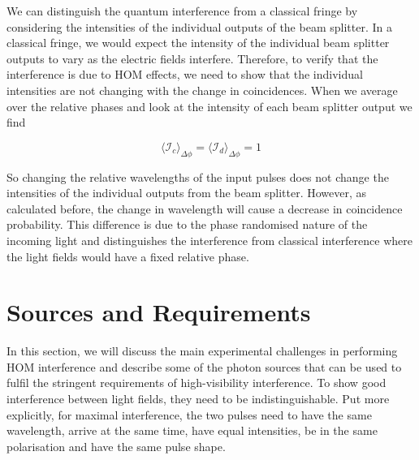 We can distinguish the quantum interference from a classical fringe by considering the intensities of the individual outputs of the beam splitter. In a classical fringe, we would expect the intensity of the individual beam splitter outputs to vary as the electric fields interfere. Therefore, to verify that the interference is due to \ac{HOM} effects, we need to show that the individual intensities are not changing with the change in coincidences. When we average over the relative phases and look at the intensity of each beam splitter output we find

\begin{equation}
	\langle \mathcal{I}_c \rangle_{\Delta\phi} = \langle \mathcal{I}_d \rangle_{\Delta\phi} = 1
\end{equation}

So changing the relative wavelengths of the input pulses does not change the intensities of the individual outputs from the beam splitter. However, as calculated before, the change in wavelength will cause a decrease in coincidence probability. This difference is due to the phase randomised nature of the incoming light and distinguishes the interference from classical interference where the light fields would have a fixed relative phase.

%

\section{Sources and Requirements}
\label{sec:sources}

In this section, we will discuss the main experimental challenges in performing \ac{HOM} interference and describe some of the photon sources that can be used to fulfil the stringent requirements of high-visibility interference. To show good interference between light fields, they need to be indistinguishable. Put more explicitly, for maximal interference, the two pulses need to have the same wavelength, arrive at the same time, have equal intensities, be in the same polarisation and have the same pulse shape.


